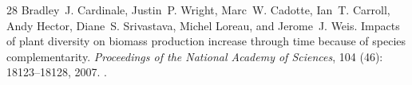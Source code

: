 \documentclass[11pt]{article}
\theoremstyle{plain}
\theoremstyle{definition}
\theoremstyle{remark}
\begin{document}
\begin{thebibliography}{28}
Bradley~J. Cardinale, Justin~P. Wright, Marc~W. Cadotte, Ian~T. Carroll, Andy
  Hector, Diane~S. Srivastava, Michel Loreau, and Jerome~J. Weis.
\newblock Impacts of plant diversity on biomass production increase through
  time because of species complementarity.
\newblock \emph{Proceedings of the National Academy of Sciences}, 104
  (46): 18123--18128, 2007.
\newblock {}.

\end{thebibliography}
\end{document}
